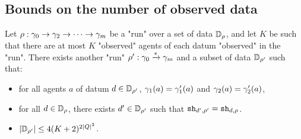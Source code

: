 \subsection{Bounds on the number of observed data}

\begin{lemma}
	\label{lem:data-core-lemma}
	Let $\rho : \gamma_0 \to \gamma_2 \to \cdots \to \gamma_m$ be a "run"  over a set of data $\mathbb{D}_{\rho}$, and let $K$ be such that there are at most $K$ "observed" agents of each datum "observed" in the "run". There exists another "run" $\rho' : \gamma_0 \xrightarrow{*} \gamma_m$ and a subset of data $\mathbb{D}_{\rho'}$ such that:
	\begin{itemize}
		\item for all agents $a$ of datum $d \in \mathbb{D}_{\rho'}$, $\gamma_1(a) = \gamma'_1(a)$ and $\gamma_2(a) = \gamma'_2(a)$,
		
		\item for all $d \in \mathbb{D}_{\rho}$, there exists $d' \in \mathbb{D}_{\rho'}$ such that $\mathtt{sh}_{d',\rho'} = \mathtt{sh}_{d,\rho}$.
		
		\item $|\mathbb{D}_{\rho'}| \leq 4(K+2)^{2|Q|^2}$.
	\end{itemize}
\end{lemma}


